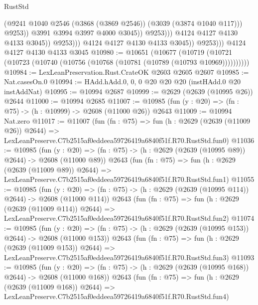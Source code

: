 \begin{lexlean}{RustStd}
\begin{coremodule}
                                      (@9241
                                        @1040
                                        @2546
                                        (@3868 (@3869 @2546))
                                        (@3039 (@3874 @1040 @117)))
                                      @9253))
                                  @3991
                                  @3994
                                  @3997
                                  @4000
                                  @3045))
                              @9253)))
                        @4124
                        @4127
                        @4130
                        @4133
                        @3045))
                    @9253)))
              @4124
              @4127
              @4130
              @4133
              @3045))
          @9253)))
    @4124
    @4127
    @4130
    @4133
    @3045
@10980 := @10651
    (@10677 (@10719 (@10721 (@10723 (@10740 (@10756 (@10768 (@10781 (@10789 (@10793 @10969))))))))))
@10984 := LexLeanPreservation.Rust.CrateOK @2603 @2605 @2607
@10985 := Nat.casesOn.{0}
@10994 := HAdd.hAdd.{0, 0, 0} @20 @20 @20 (instHAdd.{0} @20 instAddNat)
@10995 := @10994 @2687
@10999 := @2629 (@2639 (@10995 @26)) @2644
@11000 := @10994 @2685
@11007 := @10985 (fun (y : @20) => (fn : @75) -> (h : @10999) -> @2608 (@11000 @26)) @2643
@11009 := @10994 Nat.zero
@11017 := @11007
    (fun (fn : @75) =>
    fun (h : @2629 (@2639 (@11009 @26)) @2644) =>
    LexLeanPreserve.C7b2515af0eddeea59726419a6840f51f.R70.RustStd.fun0)
@11036 := @10985
    (fun (y : @20) => (fn : @75) -> (h : @2629 (@2639 (@10995 @89)) @2644) -> @2608 (@11000 @89))
    @2643
    (fun (fn : @75) =>
    fun (h : @2629 (@2639 (@11009 @89)) @2644) =>
    LexLeanPreserve.C7b2515af0eddeea59726419a6840f51f.R70.RustStd.fun1)
@11055 := @10985
    (fun (y : @20) => (fn : @75) -> (h : @2629 (@2639 (@10995 @114)) @2644) -> @2608 (@11000 @114))
    @2643
    (fun (fn : @75) =>
    fun (h : @2629 (@2639 (@11009 @114)) @2644) =>
    LexLeanPreserve.C7b2515af0eddeea59726419a6840f51f.R70.RustStd.fun2)
@11074 := @10985
    (fun (y : @20) => (fn : @75) -> (h : @2629 (@2639 (@10995 @153)) @2644) -> @2608 (@11000 @153))
    @2643
    (fun (fn : @75) =>
    fun (h : @2629 (@2639 (@11009 @153)) @2644) =>
    LexLeanPreserve.C7b2515af0eddeea59726419a6840f51f.R70.RustStd.fun3)
@11093 := @10985
    (fun (y : @20) => (fn : @75) -> (h : @2629 (@2639 (@10995 @168)) @2644) -> @2608 (@11000 @168))
    @2643
    (fun (fn : @75) =>
    fun (h : @2629 (@2639 (@11009 @168)) @2644) =>
    LexLeanPreserve.C7b2515af0eddeea59726419a6840f51f.R70.RustStd.fun4)

\end{coremodule}
\end{lexlean}
